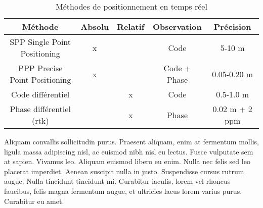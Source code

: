\begin{table}
    \begin{tabular}{c|c|c|c|c}
        \toprule
        Méthode                             & Absolu & Relatif & Observation  & Précision      \\
        \midrule
        SPP Single Point Positioning        & x      &         & Code         & 5-10 m         \\
        PPP Precise Point Positioning       & x      &         & Code + Phase & 0.05-0.20 m    \\
        Code différentiel                   &        & x       & Code         & 0.5-1.0 m      \\
        Phase différentiel (\acrshort{rtk}) &        & x       & Phase        & 0.02 m + 2 ppm \\
        \bottomrule
    \end{tabular}
    \caption{Méthodes de positionnement en temps réel}
    \label{tab:Positionnement temps réel}
\end{table}

Aliquam convallis sollicitudin purus. Praesent aliquam, enim at fermentum mollis, ligula massa adipiscing nisl, ac euismod nibh nisl eu lectus. Fusce vulputate sem at sapien. Vivamus leo. Aliquam euismod libero eu enim. Nulla nec felis sed leo placerat imperdiet. Aenean suscipit nulla in justo. Suspendisse cursus rutrum augue. Nulla tincidunt tincidunt mi. Curabitur iaculis, lorem vel rhoncus faucibus, felis magna fermentum augue, et ultricies lacus lorem varius purus. Curabitur eu amet.

